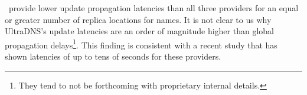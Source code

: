 %

\auspice\ provide lower update propagation latencies than all three providers for an equal or greater number of replica locations for names.  It is not clear to us why UltraDNS's update latencies are an order of magnitude higher than global propagation delays\footnote{They tend to not be forthcoming with proprietary internal details.}. This finding is consistent with a recent study \cite{dnscompare} that has shown latencies of up to tens of seconds for these providers. 

